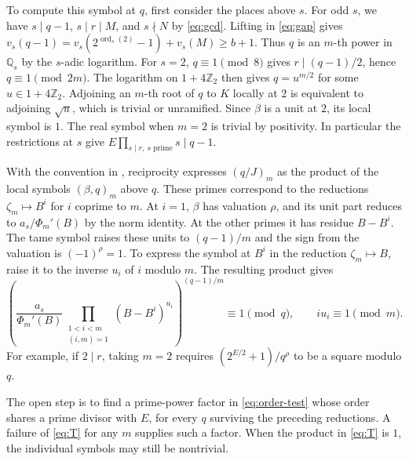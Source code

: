 \documentclass[11pt]{article}
\DeclareMathOperator{\ord}{ord}
\begin{document}
To compute this symbol at $q$, first consider the places above $s$.
For odd $s$, we have $s\mid q-1$, $s\mid r\mid M$, and $s\nmid N$
by \eqref{eq:gcd}. Lifting in \eqref{eq:gap} gives
$v_s(q-1)=v_s(2^{\ord_s(2)}-1)+v_s(M)\ge b+1$.
Thus $q$ is an $m$-th power in $\mathbb Q_s$ by the $s$-adic logarithm.
For $s=2$, $q\equiv1\pmod8$ gives $r\mid(q-1)/2$, hence
$q\equiv1\pmod{2m}$. The logarithm on $1+4\mathbb Z_2$ then gives
$q=u^{m/2}$ for some $u\in1+4\mathbb Z_2$. Adjoining an $m$-th root
of $q$ to $K$ locally at $2$ is equivalent to adjoining $\sqrt u$,
which is trivial or unramified. Since $\beta$ is a unit at $2$, its
local symbol is $1$. The real symbol when $m=2$ is trivial by positivity.
In particular the restrictions at $s$ give
$E\prod_{s\mid r,\ s\text{ prime}}s\mid q-1$.

With the convention in \cite[\S3, (5)]{SharifiCycl}, reciprocity
expresses $(q/J)_m$ as the product of the local symbols $(\beta,q)_m$
above $q$. These primes correspond to the reductions
$\zeta_m\mapsto B^i$ for $i$ coprime to $m$. At $i=1$, $\beta$ has
valuation $\rho$, and its unit part reduces to $a_s/\Phi_m'(B)$ by
the norm identity. At the other primes it has residue $B-B^i$.
The tame symbol raises these units to $(q-1)/m$ and the sign from
the valuation is $(-1)^\rho=1$. To express the symbol at
$B^i$ in the reduction $\zeta_m\mapsto B$, raise it to the inverse
$u_i$ of $i$ modulo $m$. The resulting product gives
\begin{equation}\label{eq:T}
\left(
\frac{a_s}{\Phi_m'(B)}
\prod_{\substack{1<i<m\\(i,m)=1}}(B-B^i)^{u_i}
\right)^{(q-1)/m}\equiv1\pmod q,
\qquad i u_i\equiv1\pmod m.
\end{equation}
For example, if $2\mid r$, taking $m=2$ requires
$(2^{E/2}+1)/q^\rho$ to be a square modulo $q$.

The open step is to find a prime-power factor in \eqref{eq:order-test}
whose order shares a prime divisor with $E$, for every $q$ surviving
the preceding reductions. A failure of \eqref{eq:T} for any $m$ supplies
such a factor. When the product in \eqref{eq:T} is $1$, the individual
symbols may still be nontrivial.



\end{document}
